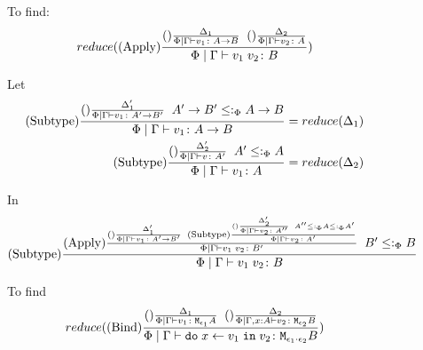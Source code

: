 \documentclass{Report}
\begin{document}
\begin{figure}
    \begin{framed}
    To find:
    \begin{equation}
        reduce((\text{Apply}) \frac{
            (\text{}) \frac{\Delta_1}{
                \Phi\mid\Gamma \vdash v_1 \colon A\rightarrow B
            }
            \;\;
            (\text{}) \frac{\Delta_2}{
                \Phi\mid\Gamma \vdash v_2 \colon A
            }
        }{
            \Phi\mid\Gamma \vdash v_1\; v_2 \colon B
        })
    \end{equation}

    Let
    \begin{align}
        (\text{Subtype}) \frac{
            (\text{}) \frac{\Delta'_1}{\Phi\mid\Gamma \vdash v_1 \colon A'\rightarrow B'}
            \;\;
            A'\rightarrow B'\leq:_\Phi A\rightarrow B
        }{
            \Phi\mid\Gamma \vdash v_1 \colon A\rightarrow B
        } & = reduce(\Delta_1)\\
        (\text{Subtype}) \frac{
            (\text{}) \frac{\Delta'_2}{\Phi\mid\Gamma \vdash v \colon A'}
            \;\;
            A'\leq:_\Phi A
        }{
            \Phi\mid\Gamma \vdash v_1 \colon A
        } & = reduce(\Delta_2)
    \end{align}

    In
    \begin{equation}
        (\text{Subtype}) \frac{
            (\text{Apply}) \frac{
                (\text{}) \frac{
                    \Delta'_1
                }{
                    \Phi\mid\Gamma \vdash v_1 \colon A'\rightarrow B'
                }
            \;\;
                (\text{Subtype}) \frac{
                    (\text{}) \frac{\Delta'_2}{\Phi\mid\Gamma \vdash v_2 \colon A''}
                    \;\;
                    A'' \leq:_\Phi A \leq:_\Phi A'
                }{
                    \Phi\mid\Gamma \vdash v_2 \colon A'
                }
            }{
                \Phi\mid\Gamma \vdash v_1\; v_2 \colon B'
            }
            \;\;
            B' \leq:_\Phi B
        }{
            \Phi\mid\Gamma \vdash v_1\; v_2 \colon B
        }
    \end{equation}



    To find
    \begin{equation}
        reduce(
            (\text{Bind}) \frac{
                (\text{}) \frac{
                    \Delta_1
                }{
                    \Phi\mid\Gamma \vdash v_1 \colon \texttt{M}_{\epsilon_1}{A}
                }
                \;\;
                (\text{}) \frac{
                    \Delta_2
                }{
                    \Phi\mid\Gamma, x: A \vdash v_2 \colon \texttt{M}_{\epsilon_2}{B}
                }
            }{
                \Phi\mid\Gamma \vdash \texttt{do}\; x \leftarrow v_1 \;\texttt{in}\; v_2 \colon \texttt{M}_{\epsilon_1\cdot\epsilon_2}{B}
            }
        )
    \end{equation}



\end{framed}
\end{figure}
\end{document}
